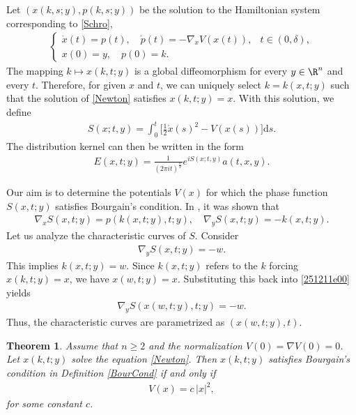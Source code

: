 \documentclass{article}
\numberwithin{equation}{section}
\theoremstyle{plain}
\newtheorem{theorem}{Theorem}[section]
\begin{document}
    Let $(x(k,s;y),p(k,s;y))$ be the solution to the Hamiltonian system corresponding to \eqref{Schro},
	\begin{align}\label{Newton}
		\begin{cases}
			\dot{x}(t)= p(t),\quad \dot{p}(t)= -\nabla_x V(x(t)), & t\in (0,\delta),  \\
			x(0)= y,\quad p(0)= k.
		\end{cases}
	\end{align}
	The mapping $k\mapsto x(k,t;y)$ is a global diffeomorphism for every $y\in\R^n$ and every $t$. Therefore, for given $x$ and $t$, we can uniquely select $k= k(x,t;y)$ such that the solution of \eqref{Newton} satisfies $x(k,t;y)= x$. With this solution, we define
	\begin{align}
		S(x;t,y)= \int_0^t \bigg[\frac12 \dot{x}(s)^2- V(x(s))\bigg] \text{d}s.
 	\end{align}
	The distribution kernel can then be written in the form
	\begin{align}
		E(x,t;y)= \frac{1}{(2\pi it)^{\frac{n}{2}}} e^{iS(x;t,y)} a(t,x,y).
	\end{align}

    \medskip
	
	Our aim is to determine the potentials $V(x)$ for which the phase function $S(x,t;y)$ satisfies Bourgain's condition. In \cite[Proposition 1.3]{F80}, it was shown that
	\begin{align}
		\nabla_x S(x,t;y)= p(k(x,t;y),t;y),\quad
		\nabla_y S(x,t;y)= -k(x,t;y).
	\end{align}
	Let us analyze the characteristic curves of $S$. Consider
	\begin{align}\label{251211e00}
		\nabla_y S(x,t;y)= -w.
	\end{align}
	This implies $k(x,t;y)=w$. Since $k(x,t;y)$ refers to the $k$ forcing $x(k,t;y)= x$, we have $x(w,t;y)= x$. Substituting this back into \eqref{251211e00} yields
	\begin{align}
		\nabla_y S(x(w,t;y),t;y)= -w.
	\end{align}
    Thus, the characteristic curves are parametrized as $(x(w,t;y),t)$.
	
	\begin{theorem}\label{SchroBour}
        Assume that $n\geq 2$ and the normalization $V(0) = \nabla V(0) = 0$. 
		Let $x(k,t;y)$ solve the equation \eqref{Newton}. Then $x(k,t;y)$ satisfies Bourgain's condition in Definition \ref{BourCond} if and only if 
		\begin{align}
			V(x)= c\, |x|^2,
		\end{align}
        for some constant $c$.
	\end{theorem}
\end{document}
